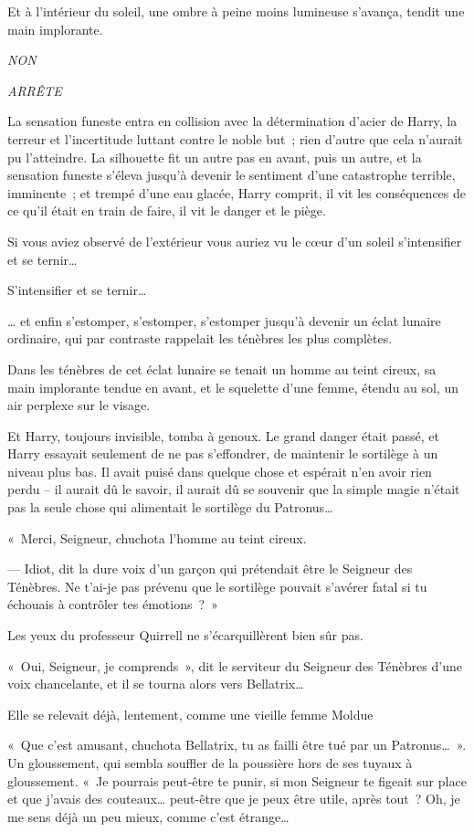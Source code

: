 Et à l'intérieur du soleil, une ombre à peine moins lumineuse s'avança, tendit une main implorante.

\emph{NON}

\emph{ARRÊTE}

La sensation funeste entra en collision avec la détermination d'acier de Harry, la terreur et l'incertitude luttant contre le noble but~; rien d'autre que cela n'aurait pu l'atteindre. La silhouette fit un autre pas en avant, puis un autre, et la sensation funeste s'éleva jusqu'à devenir le sentiment d'une catastrophe terrible, imminente~; et trempé d'une eau glacée, Harry comprit, il vit les conséquences de ce qu'il était en train de faire, il vit le danger et le piège.

Si vous aviez observé de l'extérieur vous auriez vu le cœur d'un soleil s'intensifier et se ternir…

S'intensifier et se ternir…

… et enfin s'estomper, s'estomper, s'estomper jusqu'à devenir un éclat lunaire ordinaire, qui par contraste rappelait les ténèbres les plus complètes.

Dans les ténèbres de cet éclat lunaire se tenait un homme au teint cireux, sa main implorante tendue en avant, et le squelette d'une femme, étendu au sol, un air perplexe sur le visage.

Et Harry, toujours invisible, tomba à genoux. Le grand danger était passé, et Harry essayait seulement de ne pas s'effondrer, de maintenir le sortilège à un niveau plus bas. Il avait puisé dans quelque chose et espérait n'en avoir rien perdu -- il aurait dû le savoir, il aurait dû se souvenir que la simple magie n'était pas la seule chose qui alimentait le sortilège du Patronus…

«~Merci, Seigneur, chuchota l'homme au teint cireux.

--- Idiot, dit la dure voix d'un garçon qui prétendait être le Seigneur des Ténèbres. Ne t'ai-je pas prévenu que le sortilège pouvait s'avérer fatal si tu échouais à contrôler tes émotions~?~»

Les yeux du professeur Quirrell ne s'écarquillèrent bien sûr pas.

«~Oui, Seigneur, je comprends~», dit le serviteur du Seigneur des Ténèbres d'une voix chancelante, et il se tourna alors vers Bellatrix…

Elle se relevait déjà, lentement, comme une vieille femme Moldue

 «~Que c'est amusant, chuchota Bellatrix, tu as failli être tué par un Patronus…~». Un gloussement, qui sembla souffler de la poussière hors de ses tuyaux à gloussement. «~Je pourrais peut-être te punir, si mon Seigneur te figeait sur place et que j'avais des couteaux… peut-être que je peux être utile, après tout~? Oh, je me sens déjà un peu mieux, comme c'est étrange…

